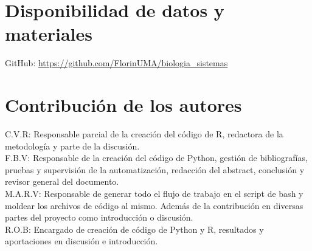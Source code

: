 \documentclass{bmcart}
\begin{document}
	\begin{backmatter}
	
		
		\section*{Disponibilidad de datos y materiales}%
			GitHub: \url{https://github.com/FlorinUMA/biologia_sistemas}
		
		\section*{Contribución de los autores}
			C.V.R: Responsable parcial de la creación del código de R, redactora de la metodología y parte de la discusión.\\
			F.B.V: Responsable de la creación del código de Python, gestión de bibliografías, pruebas y supervisión de la automatización, redacción del abstract, conclusión y revisor general del documento.\\
			M.A.R.V: Responsable de generar todo el flujo de trabajo en el script de bash y moldear los archivos de código al mismo. Además de la contribución en diversas partes del proyecto como introducción o discusión.\\
			R.O.B: Encargado de creación de código de Python y R, resultados y aportaciones en discusión e introducción.
			
		
		
		
	
	\end{backmatter}
\end{document}
